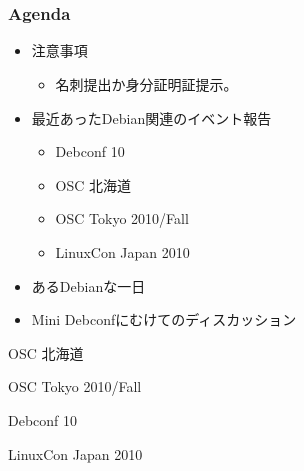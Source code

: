 \frame{\titlepage{}}

\section{}
\begin{frame}
 \frametitle{Agenda}
\begin{minipage}[t]{0.45\hsize}
  \begin{itemize}
  \item 注意事項
	\begin{itemize}
	 \item 名刺提出か身分証明証提示。
	\end{itemize}
  \item 最近あったDebian関連のイベント報告
	\begin{itemize}
	 \item Debconf 10
	 \item OSC 北海道
	 \item OSC Tokyo 2010/Fall
	 \item LinuxCon Japan 2010
	\end{itemize}
 \end{itemize}
\end{minipage} 
\begin{minipage}[t]{0.45\hsize}
 \begin{itemize}
  \item あるDebianな一日
  \item Mini Debconfにむけてのディスカッション
 \end{itemize}
\end{minipage}
\end{frame}


\begin{frame}{OSC 北海道}

\end{frame}

\begin{frame}{OSC Tokyo 2010/Fall}

\end{frame}

\begin{frame}{Debconf 10}

\end{frame}

\begin{frame}{LinuxCon Japan 2010}

\end{frame}

